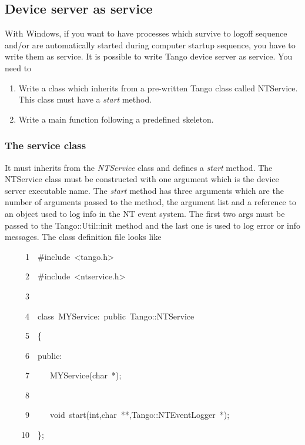\subsection{Device server as service}

With Windows, if you want to have processes which survive to logoff
sequence and/or are automatically started during computer startup
sequence, you have to write them as service. It is
possible to write Tango device server as service. You need to
\begin{enumerate}
\item Write a class which inherits from a pre-written Tango class called
NTService. This class must have a \emph{start} method. 
\item Write a main function following a predefined skeleton.
\end{enumerate}

\subsubsection{The service class}

It must inherits from the \emph{NTService} class and defines a \emph{start}
method. The NTService class must be constructed
with one argument which is the device server executable
name. The \emph{start} method has three arguments which are the number
of arguments passed to the method, the argument list and a reference
to an object used to log info in the NT event system. The first two
args must be passed to the Tango::Util::init method and the last one
is used to log error or info messages. The class definition file looks
like


\begin{lyxcode}
~~~~~1~~\#include~<tango.h>

~~~~~2~~\#include~<ntservice.h>

~~~~~3~~

~~~~~4~~class~MYService:~public~Tango::NTService

~~~~~5~~\{

~~~~~6~~public:

~~~~~7~~~~~MYService(char~{*});

~~~~~8~~

~~~~~9~~~~~void~start(int,char~{*}{*},Tango::NTEventLogger~{*});

~~~~10~~\};
\end{lyxcode}



